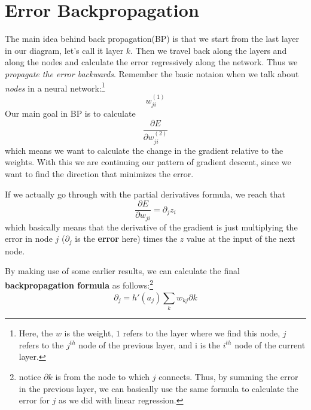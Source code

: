 \documentclass{tufte-handout}
\begin{document}
\section{Error Backpropagation}
The main idea behind back propagation(BP) is that we start from the last layer in our diagram, let's 
call it layer $k$. Then we travel back along the layers and along the nodes and calculate the 
error regressively along the network. Thus we \textit{propagate the error backwards}. Remember the 
basic notaion when we talk about \textit{nodes} in a neural network:\footnote{ Here, the $w$ is the 
weight, $1$ refers to the layer where we find this node, $j$ refers to the $j^{th}$ node of the 
previous layer, and i is the $i^{th}$ node of the current layer.}
\[ w^{(1)}_{ji}\]
Our main goal in BP is to calculate 
\[\frac{\partial E}{\partial w^{(2)}_{ji}}\]  
which means we want to calculate the change in the gradient relative to the weights. With this we are 
continuing our pattern of gradient descent, since we want to find the direction that minimizes the error.

If we actually go through with the partial derivatives formula, we reach that
\[ \frac{\partial E}{\partial w_{ji}} = \partial_{j}z_{i}\]
which basically means that the derivative of the gradient is just multiplying the error in node $j$
($\partial_{j}$ is the \textbf{error} here) times the $z$ value at the input of the next node.

By making use of some earlier results, we can calculate the final \textbf{backpropagation formula} as
follows:\footnote{notice $\partial k$ is from the node to which $j$ connects. Thus, by summing the 
error in the previous layer, we can basically use the same formula to calculate the error for $j$
as we did with linear regression.}
\[\partial_{j} = h'(a_{j})\sum_{k}^{}w_{kj}\partial k\]
\end{document}
